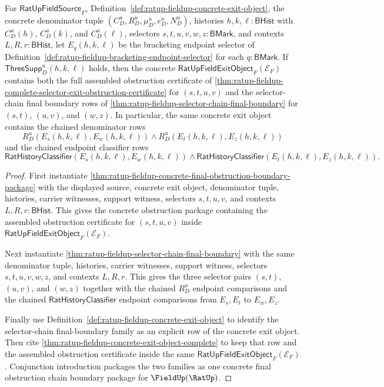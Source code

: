 \begin{theorem}
\label{thm:ratup-fieldup-concrete-final-obstruction-chain-boundary-package}
For $\mathsf{RatUpFieldSource}_F$,
Definition~\ref{def:ratup-fieldup-concrete-exit-object}, the concrete
denominator tuple $(C_D^u,R_D^u,\mu_D^u,e_D^u,N_D^u)$, histories
$h,k,\ell:\mathsf{BHist}$ with $C_D^u(h)$, $C_D^u(k)$, and $C_D^u(\ell)$,
selectors $s,t,u,v,w,z:\mathsf{BMark}$, and contexts
$L,R,r:\mathsf{BHist}$, let $E_q(h,k,\ell)$ be the bracketing endpoint selector
of Definition~\ref{def:ratup-fieldup-bracketing-endpoint-selector} for each
$q:\mathsf{BMark}$. If $\mathsf{ThreeSupp}_D^u(h,k,\ell)$ holds, then the
concrete $\mathsf{RatUpFieldExitObject}_F(\mathcal E_F)$ contains both the full
assembled obstruction certificate of
\autoref{thm:ratup-fieldup-complete-selector-exit-obstruction-certificate} for
$(s,t,u,v)$ and the selector-chain final boundary rows of
\autoref{thm:ratup-fieldup-selector-chain-final-boundary} for
$(s,t)$, $(u,v)$, and $(w,z)$. In particular, the same concrete exit object
contains the chained denominator rows
$$
R_D^u(E_s(h,k,\ell),E_w(h,k,\ell))
\land
R_D^u(E_t(h,k,\ell),E_z(h,k,\ell))
$$
and the chained endpoint classifier rows
$$
\mathsf{RatHistoryClassifier}(E_s(h,k,\ell),E_w(h,k,\ell))
\land
\mathsf{RatHistoryClassifier}(E_t(h,k,\ell),E_z(h,k,\ell)).
$$
\end{theorem}
\begin{proof}
First instantiate
\autoref{thm:ratup-fieldup-concrete-final-obstruction-boundary-package} with
the displayed source, concrete exit object, denominator tuple, histories,
carrier witnesses, support witness, selectors $s,t,u,v$, and contexts
$L,R,r:\mathsf{BHist}$. This gives the concrete obstruction package containing
the assembled obstruction certificate for $(s,t,u,v)$ inside
$\mathsf{RatUpFieldExitObject}_F(\mathcal E_F)$.

Next instantiate \autoref{thm:ratup-fieldup-selector-chain-final-boundary} with
the same denominator tuple, histories, carrier witnesses, support witness,
selectors $s,t,u,v,w,z$, and contexts $L,R,r$. This gives the three selector
pairs $(s,t)$, $(u,v)$, and $(w,z)$ together with the chained $R_D^u$ endpoint
comparisons and the chained $\mathsf{RatHistoryClassifier}$ endpoint
comparisons from $E_s,E_t$ to $E_w,E_z$.

Finally use Definition~\ref{def:ratup-fieldup-concrete-exit-object} to identify
the selector-chain final-boundary family as an explicit row of the concrete exit
object. Then cite \autoref{thm:ratup-fieldup-concrete-exit-object-complete} to
keep that row and the assembled obstruction certificate inside the same
$\mathsf{RatUpFieldExitObject}_F(\mathcal E_F)$. Conjunction introduction
packages the two families as one concrete final obstruction chain boundary
package for $\FieldUp(\RatUp)$.
\end{proof}

